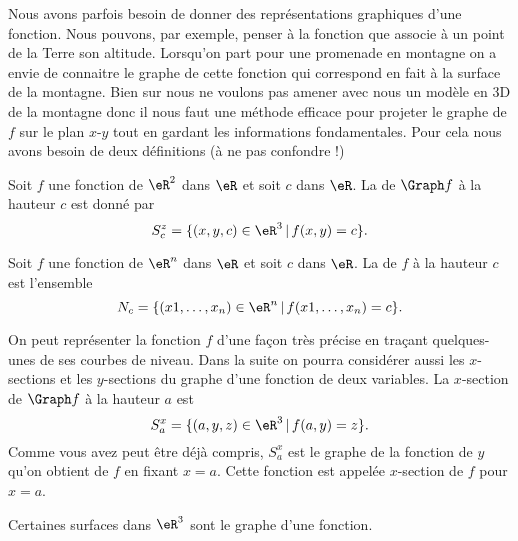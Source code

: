 Nous avons parfois besoin de donner des représentations graphiques d'une fonction. Nous pouvons, par exemple, penser à la fonction que associe à un point de la Terre son altitude. Lorsqu'on part pour une promenade en montagne on a envie de connaitre le graphe de cette fonction qui correspond en fait à la surface de la montagne. Bien sur nous ne voulons pas amener avec nous un modèle en 3D de la montagne donc il nous faut une méthode efficace pour projeter le graphe de $f$ sur le plan $x$-$y$ tout en gardant les informations fondamentales. Pour cela nous avons besoin de deux définitions (à ne pas confondre !)
\begin{definition}
	Soit $f$ une fonction de $\eR^2$ dans $\eR$ et soit $c$ dans $\eR$.  La  de $\Graph f$ à la hauteur $c$ est donné par
\[
S^z_c=\{ (x,y,c)\in \eR^3\,|\, f(x,y)=c\}.
\]
\end{definition}

\begin{definition}\label{def_niveau}
	Soit $f$ une fonction de $\eR^n$ dans $\eR$ et soit $c$ dans $\eR$. La  de $f$ à la hauteur $c$ est l'ensemble
    \begin{equation}
        N_c=\{ (x1,\ldots, x_n)\in \eR^n\,|\, f(x1,\ldots, x_n)=c\}.
    \end{equation}
\end{definition}
On peut représenter la fonction $f$ d'une façon très précise en traçant quelques-unes de ses courbes de niveau.  Dans la suite on pourra considérer aussi les $x$-sections et les $y$-sections du graphe d'une fonction de deux variables. La $x$-section de $\Graph f$ à la hauteur $a$ est
\[
S^x_a=\{(a,y,z)\in\eR^3\,|\, f(a,y)=z\}.
\]
Comme vous avez peut être déjà compris, $S^x_a$ est le graphe de la fonction de $y$ qu'on obtient de $f$ en fixant $x=a$. Cette fonction est appelée $x$-section de $f$ pour $x=a$.

Certaines surfaces dans $\eR^3$ sont le graphe d'une fonction.

